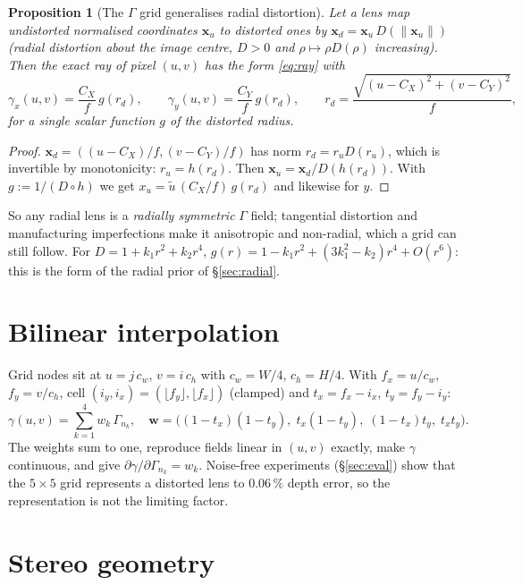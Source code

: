 \documentclass[11pt,a4paper]{article}
\newcommand{\G}{\Gamma}
\newtheorem{proposition}{Proposition}
\begin{document}
\begin{proposition}[The $\G$ grid generalises radial distortion]\label{prop:radial}
Let a lens map undistorted normalised coordinates $\mathbf x_u$ to distorted ones by
$\mathbf x_d=\mathbf x_u\,D(\|\mathbf x_u\|)$ (radial distortion about the image centre, $D>0$ and
$\rho\mapsto\rho D(\rho)$ increasing). Then the exact ray of pixel $(u,v)$ has the form \eqref{eq:ray} with
\[
\gamma_x(u,v)=\frac{C_X}{f}\,g(r_d),\qquad \gamma_y(u,v)=\frac{C_Y}{f}\,g(r_d),\qquad
r_d=\frac{\sqrt{(u-C_X)^2+(v-C_Y)^2}}{f},
\]
for a single scalar function $g$ of the distorted radius.
\end{proposition}
\begin{proof}
$\mathbf x_d=((u-C_X)/f,(v-C_Y)/f)$ has norm $r_d=r_uD(r_u)$, which is invertible by monotonicity: $r_u=h(r_d)$.
Then $\mathbf x_u=\mathbf x_d/D(h(r_d))$. With $g:=1/(D\circ h)$ we get $x_u=\tilde u\,(C_X/f)\,g(r_d)$ and likewise
for $y$.
\end{proof}
So any radial lens is a \emph{radially symmetric} $\G$ field; tangential distortion and manufacturing
imperfections make it anisotropic and non-radial, which a grid can still follow. For
$D=1+k_1r^2+k_2r^4$, $g(r)=1-k_1r^2+(3k_1^2-k_2)r^4+O(r^6)$: this is the form of the radial prior
of \S\ref{sec:radial}.

\section{Bilinear interpolation}
Grid nodes sit at $u=j\,c_w$, $v=i\,c_h$ with $c_w=W/4$, $c_h=H/4$. With $f_x=u/c_w$, $f_y=v/c_h$, cell
$(i_y,i_x)=(\lfloor f_y\rfloor,\lfloor f_x\rfloor)$ (clamped) and $t_x=f_x-i_x$, $t_y=f_y-i_y$:
\begin{equation}\label{eq:bilinear}
\gamma(u,v)=\sum_{k=1}^{4}w_k\,\G_{n_k},\quad
\mathbf w=\big((1-t_x)(1-t_y),\;t_x(1-t_y),\;(1-t_x)t_y,\;t_xt_y\big).
\end{equation}
The weights sum to one, reproduce fields linear in $(u,v)$ exactly, make $\gamma$ continuous, and give
$\partial\gamma/\partial\G_{n_k}=w_k$. Noise-free experiments (\S\ref{sec:eval}) show that the $5\times5$ grid
represents a distorted lens to $0.06\,\%$ depth error, so the representation is not the limiting factor.

\section{Stereo geometry}
\end{document}
